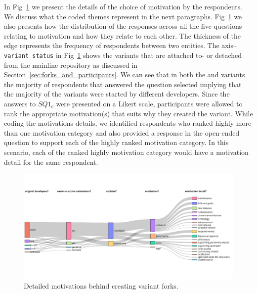 In Fig~\ref{fig:sankey_motivation} we present the details of the choice of motivation by the respondents. We discuss what the coded themes represent in the next paragraphs.
Fig~\ref{fig:sankey_motivation} we also presents how the distribution of the responses across all the five questions relating to motivation and how they relate to each other. The thickness of the edge represents the frequency of respondents between two entities.
The axis--\texttt{variant status} in Fig~\ref{fig:sankey_motivation} shows the variants that are attached to- or detached from the mainline repository as discussed in Section~\ref{sec:forks_and_participants}. We can see that in both the  and  variants the majority of respondents that answered the question  selected  implying that the majority of the variants were started by different developers.
Since the answers to $SQ1_{c}$ were presented on a Likert scale, participants were allowed to rank the appropriate motivation(s) that suits why they created the variant. While coding the motivations details, we identified respondents who ranked highly more than one motivation category and also provided a response in the open-ended question to support each of the highly ranked motivation category. In this scenario, each of the ranked highly motivation category would have a motivation detail for the same respondent.  

\begin{figure}[ht]
\begin{center}
    \centering
    \includegraphics[width=\textwidth]{pdfs/sankey_motivations_2.pdf}
    \caption{Detailed motivations behind creating variant forks.
    }
    \label{fig:sankey_motivation}
\end{center}
\vspace{-.3cm}
\end{figure}


